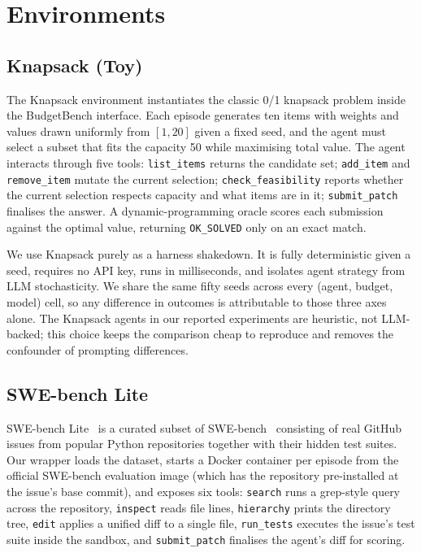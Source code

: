 \documentclass[11pt]{article}
\begin{document}
\section{Environments}
\label{sec:envs}

\subsection{Knapsack (Toy)}
\label{sec:envs:knapsack}

The Knapsack environment instantiates the classic 0/1 knapsack problem
inside the BudgetBench interface. Each episode generates ten items with
weights and values drawn uniformly from $[1, 20]$ given a fixed seed,
and the agent must select a subset that fits the capacity 50 while
maximising total value. The agent interacts through five tools:
\texttt{list\_items} returns the candidate set; \texttt{add\_item} and
\texttt{remove\_item} mutate the current selection;
\texttt{check\_feasibility} reports whether the current selection
respects capacity and what items are in it; \texttt{submit\_patch}
finalises the answer. A dynamic-programming oracle scores each submission
against the optimal value, returning \texttt{OK\_SOLVED} only on an exact
match.

We use Knapsack purely as a harness shakedown. It is fully deterministic
given a seed, requires no API key, runs in milliseconds, and isolates
agent strategy from LLM stochasticity. We share the same fifty seeds
across every (agent, budget, model) cell, so any difference in outcomes
is attributable to those three axes alone. The Knapsack
agents in our reported experiments are heuristic, not LLM-backed; this
choice keeps the comparison cheap to reproduce and removes the
confounder of prompting differences.

\subsection{SWE-bench Lite}
\label{sec:envs:swe}

SWE-bench Lite~\cite{swebenchlite2024} is a curated subset of
SWE-bench~\cite{jimenez2024swebench} consisting of real GitHub issues from
popular Python repositories together with their hidden test suites.
Our wrapper loads the dataset, starts a Docker container per episode
from the official SWE-bench evaluation image (which has the repository
pre-installed at the issue's base commit), and exposes six tools:
\texttt{search} runs a grep-style query across the repository,
\texttt{inspect} reads file lines, \texttt{hierarchy} prints the
directory tree, \texttt{edit} applies a unified diff to a single file,
\texttt{run\_tests} executes the issue's test suite inside the sandbox,
and \texttt{submit\_patch} finalises the agent's diff for scoring.
\end{document}
